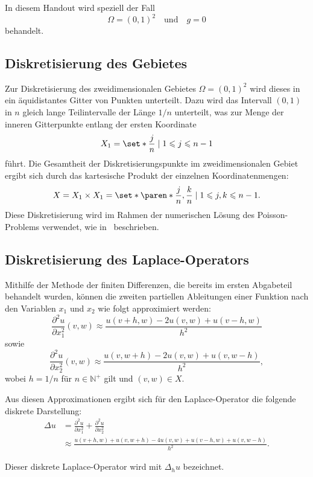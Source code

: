 \documentclass{scrartcl}
\newcommand\N{\mathbb{N}}
\begin{document}
In diesem Handout wird speziell der Fall
\[
    \Omega = {(0, 1)}^2 \quad \text{und} \quad g = 0
\] behandelt.

\subsection{Diskretisierung des Gebietes}

Zur Diskretisierung des zweidimensionalen Gebietes \(\Omega = {(0,1)}^2\) wird
dieses in ein äquidistantes Gitter von Punkten unterteilt. Dazu wird das
Intervall \((0,1)\) in \(n\) gleich lange Teilintervalle der Länge \(1 / n\)
unterteilt, was zur Menge der inneren Gitterpunkte entlang der ersten
Koordinate
\[
    X_1 = \set*{\frac{j}{n} \mid 1 \leqslant j \leqslant n - 1}
\]
führt. Die Gesamtheit der Diskretisierungspunkte im zweidimensionalen Gebiet
  ergibt sich durch das kartesische Produkt der einzelnen Koordinatenmengen:
\[
    X
    = X_1 \times X_1
    = \set*{\paren*{\frac{j}{n}, \frac{k}{n}} \mid 1 \leqslant j, k \leqslant n - 1}.
\]
Diese Diskretisierung wird im Rahmen der numerischen Lösung des
  Poisson-Problems verwendet, wie in~\cite{PPI_Poisson} beschrieben.

\subsection{Diskretisierung des Laplace-Operators}

Mithilfe der Methode der finiten Differenzen, die bereits im ersten Abgabeteil
behandelt wurden, können die zweiten partiellen Ableitungen einer Funktion nach
den Variablen \(x_1\) und \(x_2\) wie folgt approximiert werden:
\[
    \frac{\partial^2 u}{\partial x_1^2} (v, w) \approx \frac{u(v + h, w) - 2u(v, w) + u(v - h, w)}{h^2}
\]
sowie
\[
    \frac{\partial^2 u}{\partial x_2^2} (v, w) \approx \frac{u(v, w + h) - 2u(v, w) + u(v, w - h)}{h^2},
\]
wobei \(h = 1 / n\) für \(n \in \N^+\) gilt und \((v, w) \in X\).

Aus diesen Approximationen ergibt sich für den Laplace-Operator die folgende
diskrete Darstellung:
\begin{align*}
    \Delta u & = \frac{\partial^2 u}{\partial x_1^2} + \frac{\partial^2 u}{\partial x_2^2}           \\
             & \approx \frac{u(v + h, w) + u(v, w + h) - 4u(v, w) + u(v - h, w) + u(v, w - h)}{h^2}.
\end{align*}

Dieser diskrete Laplace-Operator wird mit \(\Delta_h u\) bezeichnet.
\end{document}
